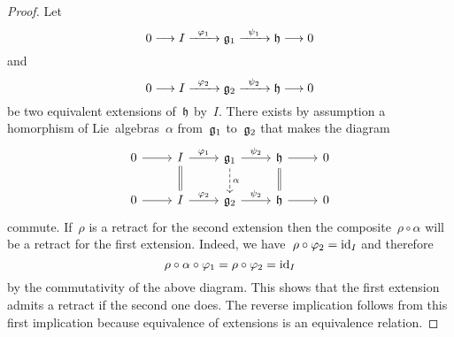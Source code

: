 \begin{proof}
  Let
  \[
    0
    \to
    I
    \xto{\varphi_1}
    \glie_1
    \xto{\psi_1}
    \hlie
    \to
    0
  \]
  and
  \[
    0
    \to
    I
    \xto{\varphi_2}
    \glie_2
    \xto{\psi_2}
    \hlie
    \to
    0
  \]
  be two equivalent extensions of~$\mathfrak{h}$ by~$I$.
  There exists by assumption a homorphism of Lie~algebras~$\alpha$ from~$\mathfrak{g}_1$ to~$\mathfrak{g}_2$ that makes the diagram
  \[
    \begin{tikzcd}
      0
      \arrow{r}
      &
      I
      \arrow{r}[above]{\varphi_1}
      \arrow[equal]{d}
      &
      \glie_1
      \arrow{r}[above]{\psi_2}
      \arrow[dashed]{d}[right]{\alpha}
      &
      \hlie
      \arrow{r}
      \arrow[equal]{d}
      &
      0
      \\
      0
      \arrow{r}
      &
      I
      \arrow{r}[above]{\varphi_2}
      &
      \glie_2
      \arrow{r}[above]{\psi_2}
      &
      \hlie
      \arrow{r}
      &
      0
    \end{tikzcd}
  \]
  commute.
  If~$\rho$ is a retract for the second extension then the composite~$\rho \circ \alpha$ will be a retract for the first extension.
  Indeed, we have~$\rho \circ \varphi_2 = \mathrm{id}_I$ and therefore
  \[
    \rho \circ \alpha \circ \varphi_1
    =
    \rho \circ \varphi_2
    =
    \mathrm{id}_I
  \]
  by the commutativity of the above diagram.
  This shows that the first extension admits a retract if the second one does.
  The reverse implication follows from this first implication because equivalence of extensions is an equivalence relation.
\end{proof}


